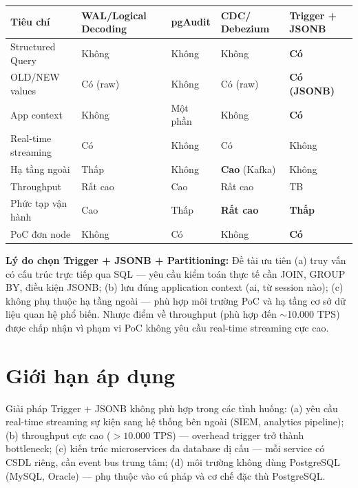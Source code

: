 \begin{center}
\label{tab:solution-comparison}
\setlength{\tabcolsep}{4pt}
\footnotesize
\begin{tabularx}{\textwidth}{p{3.5cm}>{\centering\arraybackslash}X>{\centering\arraybackslash}X>{\centering\arraybackslash}X>{\centering\arraybackslash}X}
\toprule
\textbf{Tiêu chí} & \textbf{WAL/Logical Decoding} & \textbf{pgAudit} & \textbf{CDC/ Debezium} & \textbf{Trigger + JSONB} \\
\midrule
Structured Query & Không & Không & Không & \textbf{Có} \\
OLD/NEW values & Có (raw) & Không & Có (raw) & \textbf{Có (JSONB)} \\
App context & Không & Một phần & Không & \textbf{Có} \\
Real-time streaming & Có & Không & Có & Không \\
Hạ tầng ngoài & Thấp & Không & \textbf{Cao} (Kafka) & Không \\
Throughput & Rất cao & Cao & Rất cao & TB \\
Phức tạp vận hành & Cao & Thấp & \textbf{Rất cao} & \textbf{Thấp} \\
PoC đơn node & Không & Có & Không & \textbf{Có} \\
\bottomrule
\end{tabularx}
\end{center}

\textbf{Lý do chọn Trigger + JSONB + Partitioning:} Đề tài ưu tiên (a) truy vấn có cấu trúc trực tiếp qua SQL --- yêu cầu kiểm toán thực tế cần JOIN, GROUP BY, điều kiện JSONB; (b) lưu đúng application context (ai, từ session nào); (c) không phụ thuộc hạ tầng ngoài --- phù hợp môi trường PoC và hạ tầng cơ sở dữ liệu quan hệ phổ biến. Nhược điểm về throughput (phù hợp đến $\sim$10.000 TPS) được chấp nhận vì phạm vi PoC không yêu cầu real-time streaming cực cao.

\section{Giới hạn áp dụng}

Giải pháp Trigger + JSONB không phù hợp trong các tình huống: (a) yêu cầu real-time streaming sự kiện sang hệ thống bên ngoài (SIEM, analytics pipeline); (b) throughput cực cao ($>10.000$ TPS) --- overhead trigger trở thành bottleneck; (c) kiến trúc microservices đa database dị cấu --- mỗi service có CSDL riêng, cần event bus trung tâm; (d) môi trường không dùng PostgreSQL (MySQL, Oracle) --- phụ thuộc vào cú pháp và cơ chế đặc thù PostgreSQL.

